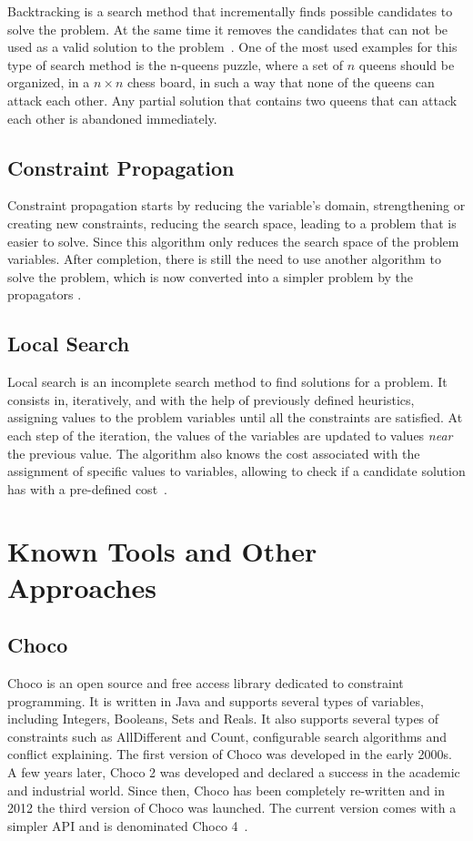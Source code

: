 Backtracking is a search method that incrementally finds possible candidates to solve the problem. At the same time it removes the candidates that can not be used as a valid solution to the problem~\cite{Knuth1997}. One of the most used examples for this type of search method is the n-queens puzzle, where a set of $n$ queens should be organized, in a $n \times n$ chess board, in such a way that none of the queens can attack each other. Any partial solution that contains two queens that can attack each other is abandoned immediately.

\subsection{Constraint Propagation}

Constraint propagation starts by reducing the variable's domain, strengthening or creating new constraints, reducing the search space, leading to a problem that is easier to solve. Since this algorithm only reduces the search space of the problem variables. After completion, there is still the need to use another algorithm to solve the problem, which is now converted into a simpler problem by the propagators \cite{Lecoutre2010}. 

\subsection{Local Search}

Local search is an incomplete search method to find solutions for a problem. It consists in, iteratively, and with the help of previously defined heuristics, assigning values to the problem variables until all the constraints are satisfied. At each step of the iteration, the values of the variables are updated to values \emph{near} the previous value. The algorithm also knows the cost associated with the assignment of specific values to variables, allowing to check if a candidate solution has with a pre-defined cost~\cite{Dechter2003}.

\section{Known Tools and Other Approaches}

\subsection{Choco}

Choco is an open source and free access library dedicated to constraint programming. It is written in Java and supports several types of variables, including Integers, Booleans, Sets and Reals. It also supports several types of constraints such as AllDifferent and Count, configurable search algorithms and conflict explaining. The first version of Choco was developed in the early 2000s. A few years later, Choco 2 was developed and declared a success in the academic and industrial world. Since then, Choco has been completely re-written and in 2012 the third version of Choco was launched. The current version comes with a simpler API and is denominated Choco 4~\cite{chocoSolver}.

